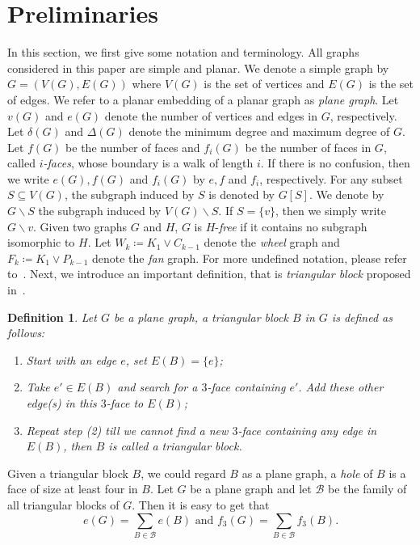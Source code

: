 \documentclass[12pt]{article}
\newtheorem{definition}{Definition}[section]
\begin{document}
 
\section{Preliminaries}
In this section, we first give some notation and terminology.
All graphs considered in this paper are simple and planar. We denote a simple graph by $G=(V(G),E(G))$ where $V(G)$ is the set of vertices and $E(G)$ is the set of edges. We refer to a planar embedding of a planar graph as \emph{plane graph}. Let $v(G)$ and $e(G)$ denote the number of vertices and edges in $G$, respectively. Let $\delta(G)$ and $\Delta(G)$ denote the minimum degree and maximum degree of $G$. Let $f(G)$ be the number of faces and $f_i(G)$ be the number of faces in $G$, called {\em $i$-faces}, whose boundary is a walk of length $i$. If there is no confusion, then we write $e(G),f(G)$ and $f_i(G)$ by $e,f$ and $f_i$, respectively.
For any subset $S\subseteq V(G)$, the subgraph induced by $S$ is denoted by $G[S]$. We denote by $G\backslash S$ the subgraph induced by $V(G)\backslash S$. If $S=\{v\}$, then we simply write $G\backslash v$. Given two graphs $G$ and $H$, $G$ is $H$-\emph{free} if it contains no subgraph isomorphic to $H$.
Let $W_{k}\coloneqq K_1\vee C_{k-1}$ denote the \emph{wheel} graph and $F_{k}\coloneqq K_1\vee P_{k-1}$ denote the \emph{fan} graph.
For more undefined notation, please refer to~\cite{graph-theory}.
Next, we introduce an important definition, that is \emph{triangular block} proposed in~\cite{ghosh2022c6}.

\begin{definition}
    Let $G$ be a plane graph, a triangular block $B$ in $G$ is defined as follows:
    \begin{enumerate}
        
        \item[(1)] Start with an edge $e$, set $E(B)=\{ e\}$;
        
        \item[(2)] Take $e'\in E(B)$ and search for a $3$-face containing $e'$. Add these other edge(s) in this $3$-face to $E(B)$;
        
        \item[(3)] Repeat step (2) till we cannot find a new $3$-face containing any edge in $E(B)$, then $B$ is called a triangular block.
    
    \end{enumerate}
\end{definition}

Given a triangular block $B$, we could regard $B$ as a plane graph, a {\em hole} of $B$ is a face of size at least four in $B$.
Let $G$ be a plane graph and let $\mathcal{B}$ be the family of all triangular blocks of $G$. Then it is easy to get that $$e(G)=\sum_{B\in \mathcal{B}}e(B) \text{ and } f_3(G)=\sum_{B\in \mathcal{B}}f_3(B).$$
\end{document}
